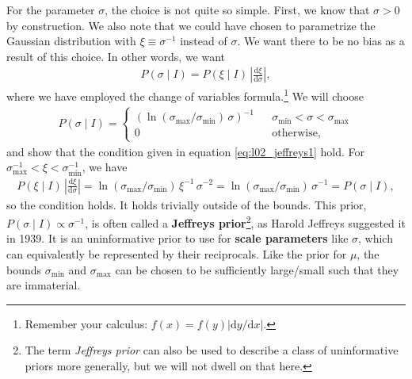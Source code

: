 For the parameter $\sigma$, the choice is not quite so simple.  First,
we know that $\sigma > 0$ by construction.  We also note that we could
have chosen to parametrize the Gaussian distribution with
$\xi \equiv \sigma^{-1}$ instead of $\sigma$.  We want there to be no
bias as a result of this choice.  In other words, we want
\begin{align}
P(\sigma\mid I) = P(\xi \mid I) \, \left|\frac{\mathrm{d}\xi}{\mathrm{d}\sigma}\right|,
\label{eq:l02_jeffreys1}
\end{align}
where we have employed the change of variables
formula.\footnote{Remember your calculus: $f(x) =
  f(y)\left|\mathrm{d}y/\mathrm{d}x\right|$.}  We will choose
\begin{align}
  P(\sigma \mid I) =  \left\{\begin{array}{ccl}
\left(\ln(\sigma_\mathrm{max} / \sigma_\mathrm{min})\,\sigma\right)^{-1} & & \sigma_\mathrm{min} < \sigma < \sigma_\mathrm{max}\\[1em]
0 & & \text{otherwise},
\end{array}\right.
\end{align}
and show that the condition given in equation \eqref{eq:l02_jeffreys1}
hold.  For $\sigma_\mathrm{max}^{-1} < \xi < \sigma_\mathrm{min}^{-1}$, we
have
\begin{align}
P(\xi \mid I) \, \left|\frac{\mathrm{d}\xi}{\mathrm{d}\sigma}\right|
= \ln(\sigma_\mathrm{max} / \sigma_\mathrm{min})\,\xi^{-1} \, \sigma^{-2}
=  \ln(\sigma_\mathrm{max} / \sigma_\mathrm{min})\,\sigma^{-1}
= P(\sigma\mid I),
\end{align}
so the condition holds.  It holds trivially outside of the bounds.
This prior, $P(\sigma\mid I) \propto \sigma^{-1}$, is often called a
\textbf{Jeffreys prior}\footnote{The term \textit{Jeffreys prior} can also be used to describe a class of uninformative priors more generally, but we will not dwell on that here.}, as Harold Jeffreys suggested it in 1939.  It is an uninformative prior to use for
\textbf{scale parameters} like $\sigma$, which can equivalently be
represented by their reciprocals.  Like the prior for $\mu$, the
bounds $\sigma_\mathrm{min}$ and $\sigma_\mathrm{max}$ can be chosen
to be sufficiently large/small such that they are immaterial.

